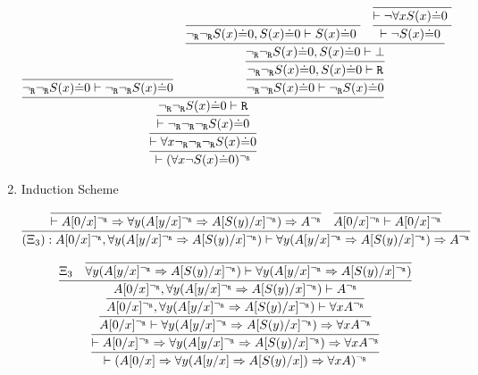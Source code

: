 \begin{enumerate}
    $$
    \infer{
        \vdash (\forall x \neg S(x)\dot{=}0)^\ngr
    }{
        \infer{
            \vdash \forall x \ngr\ngr\ngr S(x)\dot{=}0
        }{
            \infer{
                \vdash \ngr\ngr\ngr S(x)\dot{=}0
            }{
                \infer{
                    \ngr\ngr S(x)\dot{=}0 \vdash \R
                }{
                   \infer{
                        \ngr\ngr S(x)\dot{=}0 \vdash \ngr\ngr S(x)\dot{=}0
                    }{
                    }&
                   \infer{
                        \ngr\ngr S(x)\dot{=}0 \vdash \ngr S(x)\dot{=}0
                    }{
                        \infer{
                           \ngr\ngr S(x)\dot{=}0, S(x)\dot{=}0\vdash \R 
                        }{
                            \infer{
                                \ngr\ngr S(x)\dot{=}0, S(x)\dot{=}0\vdash \bottom 
                            }{
                                \infer{
                                    \ngr\ngr S(x)\dot{=}0, S(x)\dot{=}0\vdash S(x)\dot{=}0\ 
                                }{   
                                }&
                                \infer{
                                    \vdash \neg S(x)\dot{=}0\ 
                                }{
                                    \infer{
                                        \vdash \neg \forall xS(x)\dot{=}0\ 
                                    }{
                                    }
                                }
                            }
                        }
                    }
                }
            }
        }
    }
    $$
    
    \item Induction Scheme
    
    $$
    \infer{
        (\Xi_3) : A[0/x]^\ngr, \forall y(A[y/x]^\ngr \Rightarrow A[S(y)/x]^\ngr) \vdash \forall y(A[y/x]^\ngr \Rightarrow A[S(y)/x]^\ngr) \Rightarrow A^\ngr
    }{
        \infer{
            \vdash A[0/x]^\ngr \Rightarrow \forall y(A[y/x]^\ngr \Rightarrow A[S(y)/x]^\ngr) \Rightarrow A^\ngr
        }{
        }&
        \infer{
            A[0/x]^\ngr \vdash A[0/x]^\ngr
        }{
        }
    }
    $$
    
    $$
    \infer{
        \vdash (A[0/x] \Rightarrow \forall y(A[y/x] \Rightarrow A[S(y)/x]) \Rightarrow \forall x A)^\ngr
    }{
        \infer{
            \vdash A[0/x]^\ngr \Rightarrow \forall y(A[y/x]^\ngr \Rightarrow A[S(y)/x]^\ngr) \Rightarrow \forall x A^\ngr
        }{
            \infer{
                A[0/x]^\ngr \vdash \forall y(A[y/x]^\ngr \Rightarrow A[S(y)/x]^\ngr) \Rightarrow \forall x A^\ngr
            }{
                \infer{
                    A[0/x]^\ngr, \forall y(A[y/x]^\ngr \Rightarrow A[S(y)/x]^\ngr) \vdash \forall x A^\ngr
                }{
                    \infer{
                        A[0/x]^\ngr, \forall y(A[y/x]^\ngr \Rightarrow A[S(y)/x]^\ngr) \vdash A^\ngr
                    }{
                        \Xi_3
                        &
                        \infer{
                            \forall y(A[y/x]^\ngr \Rightarrow A[S(y)/x]^\ngr) \vdash \forall y(A[y/x]^\ngr \Rightarrow A[S(y)/x]^\ngr)
                        }{
                        }
                    }
                }
            }
        }
    }
    $$
\end{enumerate}